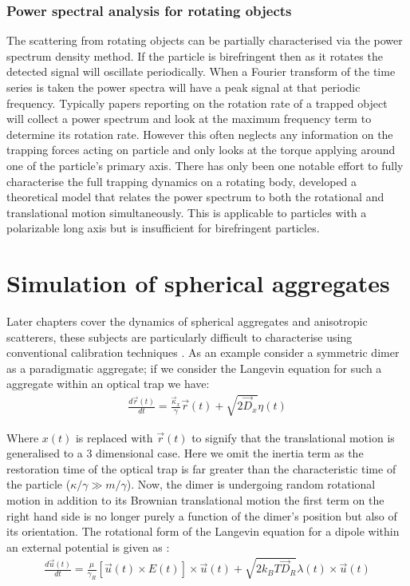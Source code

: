 \subsubsection{Power spectral analysis for rotating objects}
The scattering from rotating objects can be partially characterised via
the power spectrum density method. If the particle is birefringent then
as it rotates the detected signal will oscillate periodically. When a 
Fourier transform of the time series is taken the power spectra will 
have a peak signal at that periodic frequency. Typically papers 
reporting on the rotation rate of a trapped object will collect a power spectrum and look at the maximum frequency term to determine its rotation rate. However this often neglects any information on the trapping forces acting on particle and only looks at the torque applying around one of the particle's primary axis. There has only been one notable effort to fully characterise the full trapping dynamics on a rotating body, \cite{Yogesha2012} developed a theoretical model that relates the power spectrum to both the rotational and translational motion simultaneously. This is applicable to particles with a polarizable long axis but is insufficient for birefringent particles.

\section{Simulation of spherical aggregates}
\label{sec:simulations}
Later chapters cover the dynamics of spherical aggregates and anisotropic 
scatterers, these subjects are particularly difficult to characterise 
using conventional calibration techniques \cite{Li2008, Yogesha2011PreciseCO}. 
As an example consider a symmetric dimer as a paradigmatic aggregate; 
if we consider the Langevin equation for such a aggregate within an optical 
trap we have:
\begin{align}
	\frac{{d}\vec{r}(t)}{{dt}} = \frac{\vec{\kappa}_x}{\gamma}\vec{r}(t) + 
	\sqrt{2\vec{D}_x}\eta(t)
\end{align}

Where $x(t)$ is replaced with $\vec{r}(t)$ to signify that the translational 
motion is generalised to a 3 dimensional case. Here we omit the inertia term 
as the restoration time of the optical trap is far greater than the characteristic time of the particle ($\kappa/\gamma \gg m/\gamma$). Now, the dimer is undergoing random rotational motion in addition to its Brownian 
translational motion the first term on the right hand side is no longer 
purely a function of the dimer's position but also of its orientation. 
The rotational form of the Langevin equation for a dipole within an external 
potential is given as \cite{Mazo2008}:
\begin{align}
  \frac{{d}\vec{u}(t)}{{dt}}
  =
  \frac{\mu}{\gamma_R}\left[\vec{u}(t)\times E(t)\right]\times \vec{u}(t)
  + \sqrt{2k_BT\vec{D}_R}\lambda(t)\times \vec{u}(t)
\end{align}

